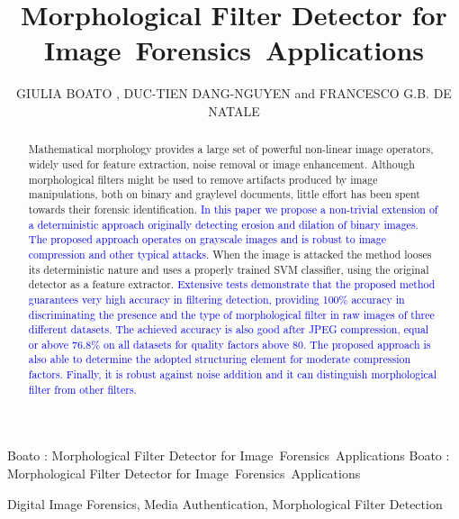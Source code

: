 \documentclass{ieeeaccess}
\newcommand{\revisedtext}[1]{\textcolor{blue}{#1}}
\begin{document}

\title{Morphological Filter Detector for Image~Forensics~Applications}
\author{\uppercase{Giulia Boato} ,
\uppercase{Duc-Tien Dang-Nguyen}  and \uppercase{Francesco G.B. De Natale}}
\address[1]{University of Trento, Italy (e-mail: giulia.boato@unitn.it; francesco.denatale@unitn.it)}
\address[2]{University of Bergen, Norway(e-mail: ductien.dangnguyen@uib.no)}

\markboth
{Boato \headeretal: Morphological Filter Detector for Image~Forensics~Applications}
{Boato \headeretal: Morphological Filter Detector for Image~Forensics~Applications}


\begin{abstract}
Mathematical morphology provides a large set of powerful non-linear image operators, widely used for feature extraction, noise removal or image enhancement. Although morphological filters might be used to remove artifacts produced by image manipulations, both on binary and graylevel documents, little effort has been spent towards their forensic identification. \revisedtext{In this paper we propose a non-trivial extension of a deterministic approach originally detecting erosion and dilation of binary images.
The proposed approach operates on grayscale images and is robust to image compression and other typical attacks.} When the image is attacked the method looses its deterministic nature and uses a properly trained SVM classifier, using the original detector as a feature extractor. \revisedtext{Extensive tests demonstrate that the proposed method guarantees very high accuracy in filtering detection, providing 100\% accuracy in discriminating the presence and
the type of morphological filter in raw images of three different datasets. The achieved accuracy is also good after JPEG compression, equal or above 76.8\% on all datasets for quality factors above 80. The proposed approach is also able to determine the adopted structuring element for moderate compression factors. Finally, it is robust against noise addition and it can distinguish morphological filter from other filters.}
\end{abstract}

\begin{keywords}
Digital Image Forensics, Media Authentication, Morphological Filter Detection
%
\end{keywords}
\end{document}
